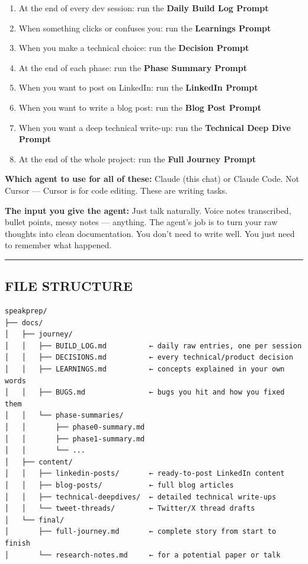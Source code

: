 \documentclass[
  11pt,
]{article}
\providecommand{\tightlist}{%
  \setlength{\itemsep}{0pt}\setlength{\parskip}{0pt}}
\begin{document}
\begin{enumerate}
\def\labelenumi{\arabic{enumi}.}
\tightlist
\item
  At the end of every dev session: run the \textbf{Daily Build Log
  Prompt}
\item
  When something clicks or confuses you: run the \textbf{Learnings
  Prompt}
\item
  When you make a technical choice: run the \textbf{Decision Prompt}
\item
  At the end of each phase: run the \textbf{Phase Summary Prompt}
\item
  When you want to post on LinkedIn: run the \textbf{LinkedIn Prompt}
\item
  When you want to write a blog post: run the \textbf{Blog Post Prompt}
\item
  When you want a deep technical write-up: run the \textbf{Technical
  Deep Dive Prompt}
\item
  At the end of the whole project: run the \textbf{Full Journey Prompt}
\end{enumerate}

\textbf{Which agent to use for all of these:} Claude (this chat) or
Claude Code. Not Cursor --- Cursor is for code editing. These are
writing tasks.

\textbf{The input you give the agent:} Just talk naturally. Voice notes
transcribed, bullet points, messy notes --- anything. The agent's job is
to turn your raw thoughts into clean documentation. You don't need to
write well. You just need to remember what happened.

\begin{center}\rule{0.5\linewidth}{0.5pt}\end{center}

\hypertarget{file-structure}{%
\subsection{FILE STRUCTURE}\label{file-structure}}

\begin{lstlisting}
speakprep/
├── docs/
│   ├── journey/
│   │   ├── BUILD_LOG.md          ← daily raw entries, one per session
│   │   ├── DECISIONS.md          ← every technical/product decision
│   │   ├── LEARNINGS.md          ← concepts explained in your own words
│   │   ├── BUGS.md               ← bugs you hit and how you fixed them
│   │   └── phase-summaries/
│   │       ├── phase0-summary.md
│   │       ├── phase1-summary.md
│   │       └── ...
│   ├── content/
│   │   ├── linkedin-posts/       ← ready-to-post LinkedIn content
│   │   ├── blog-posts/           ← full blog articles
│   │   ├── technical-deepdives/  ← detailed technical write-ups
│   │   └── tweet-threads/        ← Twitter/X thread drafts
│   └── final/
│       ├── full-journey.md       ← complete story from start to finish
│       └── research-notes.md     ← for a potential paper or talk
\end{lstlisting}
\end{document}
